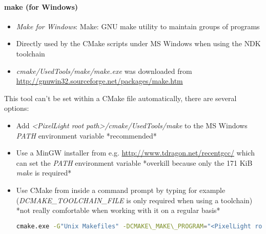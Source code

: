 \paragraph{make (for Windows)}
\begin{itemize}
\item{\emph{Make for Windows}: Make: GNU make utility to maintain groups of programs}
\item{Directly used by the CMake scripts under \ac{MS} Windows when using the \ac{NDK} toolchain}
\item{\emph{cmake/UsedTools/make/make.exe} was downloaded from \url{http://gnuwin32.sourceforge.net/packages/make.htm}}
\end{itemize}
This tool can't be set within a CMake file automatically, there are several options:
\begin{itemize}
\item{Add \emph{\textless PixelLight root path\textgreater /cmake/UsedTools/make} to the \ac{MS} Windows \emph{PATH} environment variable *recommended*}
\item{Use a MinGW installer from e.g. \url{http://www.tdragon.net/recentgcc/} which can set the \emph{PATH} environment variable *overkill because only the 171 KiB \emph{make} is required*}
\item{Use CMake from inside a command prompt by typing for example (\emph{DCMAKE\_TOOLCHAIN\_FILE} is only required when using a toolchain) \\ *not really comfortable when working with it on a regular basis*
\begin{lstlisting}[language=sh]
cmake.exe -G"Unix Makefiles" -DCMAKE\_MAKE\_PROGRAM="<PixelLight root path>/cmake/UsedTools/make/make.exe" -DCMAKE\_TOOLCHAIN\_FILE="<PixelLight root path>/cmake/Toolchains/Toolchain-ndk.cmake"
\end{lstlisting}
}
\end{itemize}




